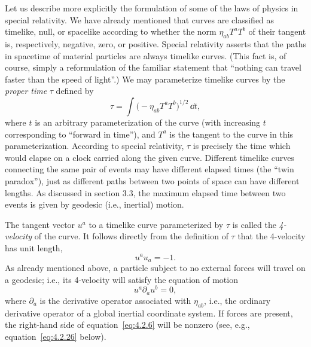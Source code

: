 Let us describe more explicitly the formulation of some of the laws of physics in
special relativity. We have already mentioned that curves are classified as
timelike, null, or spacelike according to whether the norm
\(\eta_{ab}T^aT^b\) of their tangent is, respectively, negative, zero, or
positive. Special relativity asserts that the paths in spacetime of material
particles are always timelike curves. (This fact is, of course, simply a
reformulation of the familiar statement that \textquotedblleft nothing can travel
faster than the speed of light\textquotedblright.) We may parameterize timelike
curves by the \emph{proper time} \(\tau\) defined by
\begin{equation}
  \tau=\int\bigl(-\eta_{ab}T^aT^b\bigr)^{1/2}\,\dd t ,
  \tag{4.2.4}\label{eq:4.2.4}
\end{equation}
where \(t\) is an arbitrary parameterization of the curve (with increasing \(t\)
corresponding to \textquotedblleft forward in time\textquotedblright), and
\(T^a\) is the tangent to the curve in this parameterization. According to
special relativity, \(\tau\) is precisely the time which would elapse on a clock
carried along the given curve. Different timelike curves connecting the same pair
of events may have different elapsed times (the \textquotedblleft twin
paradox\textquotedblright), just as different paths between two points of space can
have different lengths. As discussed in section 3.3, the maximum elapsed time
between two events is given by geodesic (i.e., inertial) motion.

The tangent vector \(u^a\) to a timelike curve parameterized by \(\tau\) is
called the \emph{4-velocity} of the curve. It follows directly from the definition
of \(\tau\) that the 4-velocity has unit length,
\begin{equation}
  u^au_a=-1 .
  \tag{4.2.5}\label{eq:4.2.5}
\end{equation}
As already mentioned above, a particle subject to no external forces will travel
on a geodesic; i.e., its 4-velocity will satisfy the equation of motion
\begin{equation}
  u^a\partial_a u^b=0 ,
  \tag{4.2.6}\label{eq:4.2.6}
\end{equation}
where \(\partial_a\) is the derivative operator associated with \(\eta_{ab}\),
i.e., the ordinary derivative operator of a global inertial coordinate system. If
forces are present, the right-hand side of equation~\eqref{eq:4.2.6} will be
nonzero (see, e.g., equation~\eqref{eq:4.2.26} below).

